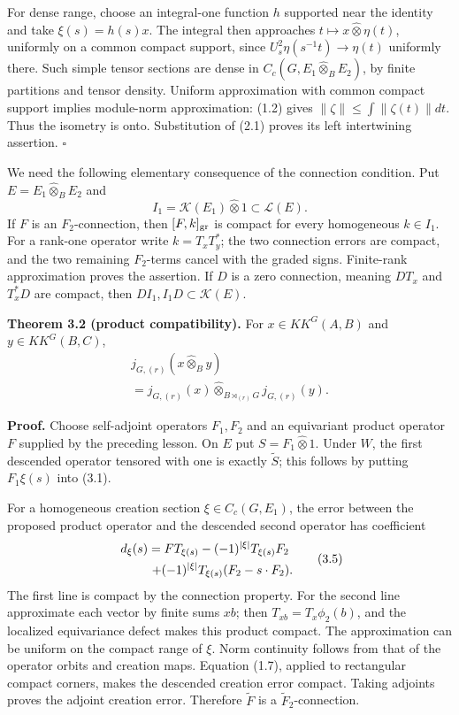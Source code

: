 \documentclass[
  11pt,
]{article}
\begin{document}
For dense range, choose an integral-one function \(h\) supported near
the identity and take \(\xi(s)=h(s)x\). The integral then approaches
\(t\mapsto x\widehat\otimes\eta(t)\), uniformly on a common compact
support, since \(U_s^2\eta(s^{-1}t)\to\eta(t)\) uniformly there. Such
simple tensor sections are dense in \(C_c(G,E_1\widehat\otimes_BE_2)\),
by finite partitions and tensor density. Uniform approximation with
common compact support implies module-norm approximation: (1.2) gives
\(\|\zeta\|\leq\int\|\zeta(t)\|dt\). Thus the isometry is onto.
Substitution of (2.1) proves its left intertwining assertion.
\(\square\)

We need the following elementary consequence of the connection
condition. Put \(E=E_1\widehat\otimes_BE_2\) and \[
I_1=\mathcal K(E_1)\widehat\otimes1\subset\mathcal L(E).
\tag{3.3}
\] If \(F\) is an \(F_2\)-connection, then \([F,k]_{\rm gr}\) is compact
for every homogeneous \(k\in I_1\). For a rank-one operator write
\(k=T_xT_y^*\); the two connection errors are compact, and the two
remaining \(F_2\)-terms cancel with the graded signs. Finite-rank
approximation proves the assertion. If \(D\) is a zero connection,
meaning \(DT_x\) and \(T_x^*D\) are compact, then
\(DI_1,I_1D\subset\mathcal K(E)\).

\textbf{Theorem 3.2 (product compatibility).} For \(x\in KK^G(A,B)\) and
\(y\in KK^G(B,C)\), \[
\begin{gathered}
j_{G,(r)}(x\widehat\otimes_By)\\
=j_{G,(r)}(x)\widehat\otimes_{B\rtimes_{(r)}G}j_{G,(r)}(y).
\end{gathered}
\tag{3.4}
\]

\textbf{Proof.} Choose self-adjoint operators \(F_1,F_2\) and an
equivariant product operator \(F\) supplied by the preceding lesson. On
\(E\) put \(S=F_1\widehat\otimes1\). Under \(W\), the first descended
operator tensored with one is exactly \(\widetilde S\); this follows by
putting \(F_1\xi(s)\) into (3.1).

For a homogeneous creation section \(\xi\in C_c(G,E_1)\), the error
between the proposed product operator and the descended second operator
has coefficient \[
\begin{gathered}
d_\xi(s)=FT_{\xi(s)}
       -(-1)^{|\xi|}T_{\xi(s)}F_2\\
\hspace{10mm}
 +(-1)^{|\xi|}T_{\xi(s)}(F_2-s\cdot F_2).
\end{gathered}
\tag{3.5}
\] The first line is compact by the connection property. For the second
line approximate each vector by finite sums \(xb\); then
\(T_{xb}=T_x\phi_2(b)\), and the localized equivariance defect makes
this product compact. The approximation can be uniform on the compact
range of \(\xi\). Norm continuity follows from that of the operator
orbits and creation maps. Equation (1.7), applied to rectangular compact
corners, makes the descended creation error compact. Taking adjoints
proves the adjoint creation error. Therefore \(\widetilde F\) is a
\(\widetilde F_2\)-connection.
\end{document}
